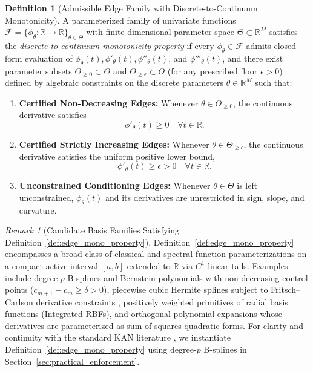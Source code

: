 \documentclass[11pt,a4paper]{article}
\theoremstyle{plain}
\theoremstyle{definition}
\newtheorem{definition}[theorem]{Definition}
\theoremstyle{remark}
\newtheorem{remark}[theorem]{Remark}
\begin{document}
\begin{definition}[Admissible Edge Family with Discrete-to-Continuum Monotonicity]
\label{lem:bspline_mono}
\label{def:edge_mono_property}
A parameterized family of univariate functions $\mathcal{F} = \{\phi_\theta : \mathbb{R} \to \mathbb{R}\}_{\theta \in \Theta}$ with finite-dimensional parameter space $\Theta \subset \mathbb{R}^M$ satisfies the \emph{discrete-to-continuum monotonicity property} if every $\phi_\theta \in \mathcal{F}$ admits closed-form evaluation of $\phi_\theta(t), \phi'_\theta(t), \phi''_\theta(t)$, and $\phi'''_\theta(t)$, and there exist parameter subsets $\Theta_{\ge 0} \subset \Theta$ and $\Theta_{\ge \epsilon} \subset \Theta$ (for any prescribed floor $\epsilon > 0$) defined by algebraic constraints on the discrete parameters $\theta \in \mathbb{R}^M$ such that:
\begin{enumerate}
    \item \textbf{Certified Non-Decreasing Edges:} Whenever $\theta \in \Theta_{\ge 0}$, the continuous derivative satisfies
    \begin{equation}
        \phi'_\theta(t) \ge 0 \quad \forall t \in \mathbb{R}.
        \label{eq:bspline_deriv_expansion}
    \end{equation}
    \item \textbf{Certified Strictly Increasing Edges:} Whenever $\theta \in \Theta_{\ge \epsilon}$, the continuous derivative satisfies the uniform positive lower bound,
    \begin{equation}
        \phi'_\theta(t) \ge \epsilon > 0 \quad \forall t \in \mathbb{R}.
        \label{eq:bspline_diff_condition}
    \end{equation}
    \item \textbf{Unconstrained Conditioning Edges:} Whenever $\theta \in \Theta$ is left unconstrained, $\phi_\theta(t)$ and its derivatives are unrestricted in sign, slope, and curvature.
\end{enumerate}
\end{definition}

\begin{remark}[Candidate Basis Families Satisfying Definition~\ref{def:edge_mono_property}]
\label{rem:candidate_edge_families}
Definition~\ref{def:edge_mono_property} encompasses a broad class of classical and spectral function parameterizations on a compact active interval $[a, b]$ extended to $\mathbb{R}$ via $C^1$ linear tails. Examples include degree-$p$ B-splines and Bernstein polynomials with non-decreasing control points ($c_{m+1} - c_m \ge \delta > 0$), piecewise cubic Hermite splines subject to Fritsch--Carlson derivative constraints \cite{fritsch1980monotone, polomolina2025monokan}, positively weighted primitives of radial basis functions (Integrated RBFs), and orthogonal polynomial expansions whose derivatives are parameterized as sum-of-squares quadratic forms. For clarity and continuity with the standard KAN literature \cite{liu2024kan}, we instantiate Definition~\ref{def:edge_mono_property} using degree-$p$ B-splines in Section~\ref{sec:practical_enforcement}.
\end{remark}
\end{document}

